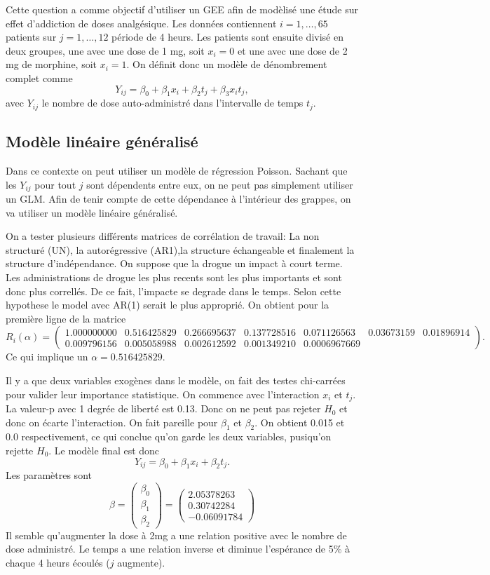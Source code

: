 \documentclass{article}
\begin{document}
Cette question a comme objectif d'utiliser un GEE afin de modèlisé une étude sur effet d'addiction de doses analgésique. Les données contiennent $i = 1, \dots, 65$ patients sur $j=1,\dots,12$ période de 4 heurs. Les patients sont ensuite divisé en deux groupes, une avec une dose de 1 mg, soit $x_i =0$ et une avec une dose de 2 mg de morphine, soit $x_i =1$. On définit donc un modèle de dénombrement complet comme
$$Y_{ij} = \beta_0 + \beta_1 x_i + \beta_2 t_j+ \beta_3 x_i t_j,$$
avec $Y_{ij}$ le nombre de dose auto-administré dans l'intervalle de temps $t_j$. 
	
	\subsection{Modèle linéaire généralisé}
	
	Dans ce contexte on peut utiliser un modèle de régression Poisson. Sachant que les $Y_{ij}$ pour tout $j$ sont dépendents entre eux, on ne peut pas simplement utiliser un GLM. Afin de tenir compte de cette dépendance à l'intérieur des grappes, on va utiliser un modèle linéaire généralisé. 
	
	On a tester plusieurs différents matrices de corrélation de travail: La non structuré (UN), la autorégressive (AR1),la structure échangeable et finalement la structure d'indépendance. On suppose que la drogue un impact à court terme. Les administrations de drogue les plus recents sont les plus importants et sont donc plus correllés. De ce fait, l'impacte se degrade dans le temps. Selon cette hypothese le model avec AR(1) serait le plus approprié.
	On obtient pour la première ligne de la matrice 
	$$
	R_i(\alpha) = 
	\begin{pmatrix}	
	1.000000000 & 0.516425829 & 0.266695637 & 0.137728516 & 0.071126563 & 0.03673159 & 0.01896914  \\
	0.009796156 & 0.005058988 & 0.002612592 & 0.001349210 & 0.0006967669
	\end{pmatrix}
	.$$
	Ce qui implique un $\alpha = 0.516425829$. 
	
	Il y a que deux variables exogènes dans le modèle, on fait des testes chi-carrées pour valider leur importance statistique. On commence avec l'interaction $x_i$ et $t_j$. La valeur-p avec 1 degrée de liberté est 0.13. Donc on ne peut pas rejeter $H_0$ et donc on écarte l'interaction. On fait pareille pour $\beta_1$ et $\beta_2$. On obtient 0.015 et 0.0 respectivement, ce qui conclue qu'on garde les deux variables, pusiqu'on rejette $H_0$. Le
	modèle final est donc 
	$$Y_{ij} = \beta_0 + \beta_1 x_i + \beta_2 t_j .$$
	Les paramètres sont 
	$$\beta = \begin{pmatrix}
	\beta_0 \\ 
	\beta_1 \\
	\beta_2
	\end{pmatrix}
	 = \begin{pmatrix}
	2.05378263  \\
	0.30742284 \\
	-0.06091784
	\end{pmatrix}$$
	Il semble qu'augmenter la dose à 2mg a une relation positive avec le nombre de dose administré. Le temps a une relation inverse et diminue l'espérance de 5\% à chaque 4 heurs écoulés ($j$ augmente).  
\end{document}
